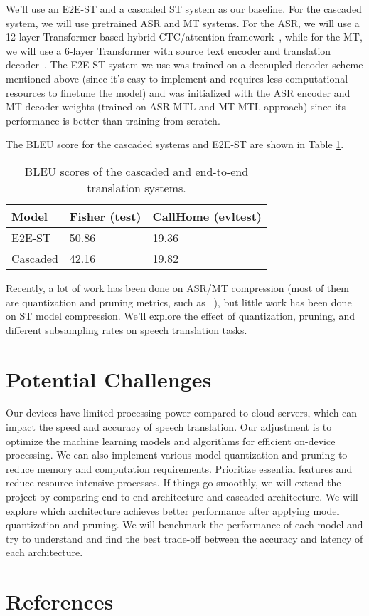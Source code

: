 \documentclass[11pt]{article}
\begin{document}
We’ll use an E2E-ST and a cascaded ST system as our baseline. For the cascaded system, we will use pretrained ASR and MT systems. For the ASR, we will use a 12-layer Transformer-based hybrid CTC/attention framework~\cite{watanabe2017hybrid}, while for the MT, we will use a 6-layer Transformer with source text encoder and translation decoder~\cite{inaguma2020espnet}. The E2E-ST system we use was trained on a  decoupled decoder scheme mentioned above (since it’s easy to implement and requires less computational resources to finetune the model) and was initialized with the ASR encoder and MT decoder weights (trained on ASR-MTL and MT-MTL approach) since its performance is better than training from scratch.

The BLEU score for the cascaded systems and E2E-ST are shown in Table \ref{Table: acc}.
\begin{table}[h]
\begin{tabular}{lll}
\hline
Model    & Fisher (test) & CallHome (evltest) \\ \hline
E2E-ST   & 50.86         & 19.36              \\
Cascaded & 42.16         & 19.82              \\ \hline
\end{tabular}
\caption{BLEU scores of the cascaded and end-to-end translation systems.}
\label{Table: acc}
\end{table}

Recently, a lot of work has been done on ASR/MT compression (most of them are quantization and pruning metrics, such as ~\cite{see2016compression}), but little work has been done on ST model compression. We’ll explore the effect of quantization, pruning, and different subsampling rates on speech translation tasks. 


\section{Potential Challenges}

Our devices have limited processing power compared to cloud servers, which can impact the speed and accuracy of speech translation. Our adjustment is to optimize the machine learning models and algorithms for efficient on-device processing. We can also implement various model quantization and pruning to reduce memory and computation requirements. Prioritize essential features and reduce resource-intensive processes. 
If things go smoothly, we will extend the project by comparing end-to-end architecture and cascaded architecture. We will explore which architecture achieves better performance after applying model quantization and pruning. We will benchmark the performance of each model and try to understand and find the best trade-off between the accuracy and latency of each architecture.  






\section{References}



\end{document}
